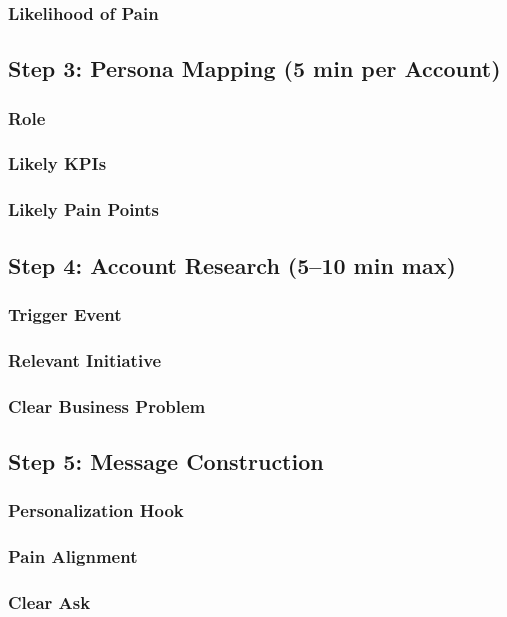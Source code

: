         \subsubsection{Likelihood of Pain}\mbox{}
    \subsection{Step 3: Persona Mapping (5 min per Account)}\mbox{}
        \subsubsection{Role}\mbox{}
        \subsubsection{Likely KPIs}\mbox{}
        \subsubsection{Likely Pain Points}\mbox{}
    \subsection{Step 4: Account Research (5--10 min max)}\mbox{}
        \subsubsection{Trigger Event}\mbox{}
        \subsubsection{Relevant Initiative}\mbox{}
        \subsubsection{Clear Business Problem}\mbox{}
    \subsection{Step 5: Message Construction}\mbox{}
        \subsubsection{Personalization Hook}\mbox{}
        \subsubsection{Pain Alignment}\mbox{}
        \subsubsection{Clear Ask}\mbox{}
        
\printbibliography[heading=secbibliography, title={References}]
